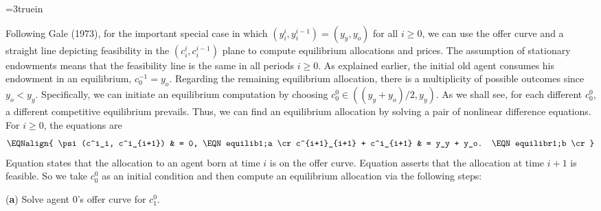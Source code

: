 
\centerline{\epsfxsize=3truein}
\caption{The offer curve and feasibility line.}
\endfigure

\medskip {}%
Following Gale (1973), for the important special case in which $(y_i^i, y_i^{i-1}) = (y_y, y_o)$ for all $i \geq 0$,
 we can use the offer curve and
a straight line depicting feasibility in the $(c^i_i, c^{i-1}_i)$ plane
to  compute equilibrium allocations and prices.  The assumption 
of stationary endowments
means that the feasibility line is the same in
all periods $i \geq 0$. As explained earlier, the initial 
old agent consumes his endowment in an equilibrium,
$c^{-1}_0 = y_o$. Regarding the remaining equilibrium 
allocation, there is a multiplicity of possible
outcomes since $y_o<y_y$. Specifically, we can initiate an
equilibrium computation by choosing
$c^0_0 \in ((y_y+y_o)/2,y_y)$.
As we shall see, for each  different $c_0^0$, a different  competitive equilibrium prevails.
Thus, we  can  find an equilibrium allocation by solving  a pair of nonlinear difference equations.
  For $i \geq 0$, the equations
are
$$\EQNalign{  \psi(c^i_i, c^i_{i+1}) & = 0, \EQN equilib1;a \cr
              c^{i+1}_{i+1} + c^i_{i+1} & = y_y + y_o. \EQN equilibr1;b \cr}$$
Equation  states that the allocation to an agent
born at time $i$ is on the offer curve. 
Equation 
asserts that the allocation at time $i+1$  is 
feasible.
So we take $c_0^0$ as an initial condition and then compute an equilibrium allocation via the following steps:


\medskip
\item{({\bf a})} Solve agent $0$'s offer curve   for $c^0_1$.

